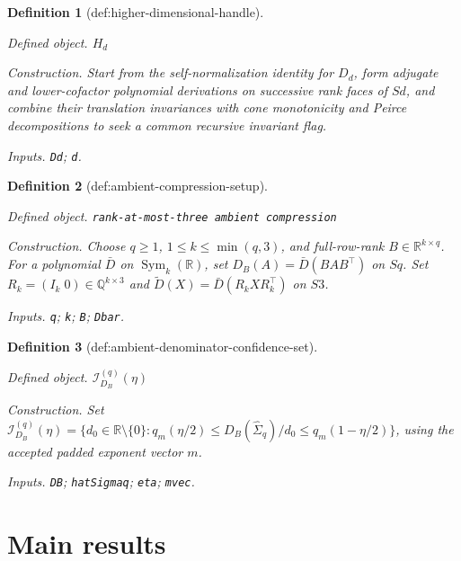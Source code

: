 \documentclass{article}
\newtheorem{definition}{Definition}
\begin{document}
\begin{definition}[def:higher-dimensional-handle]\label{def:higher-dimensional-handle}
\par\smallskip\noindent\emph{Defined object.} \(H_d\)
\par\smallskip\noindent\emph{Construction.} Start from the self-normalization identity for \(D_d\), form adjugate and lower-cofactor polynomial derivations on successive rank faces of \(Sd\), and combine their translation invariances with cone monotonicity and Peirce decompositions to seek a common recursive invariant flag.
\par\smallskip\noindent\emph{Inputs.} \texttt{Dd}; \texttt{d}.
\end{definition}

\begin{definition}[def:ambient-compression-setup]\label{def:ambient-compression-setup}
\par\smallskip\noindent\emph{Defined object.} \texttt{rank-\allowbreak{}at-\allowbreak{}most-\allowbreak{}three ambient compression}
\par\smallskip\noindent\emph{Construction.} Choose \(q\geq1\), \(1\leq k\leq\min(q,3)\), and full-row-rank \(B\in\mathbb R^{k\times q}\). For a polynomial \(\bar D\) on \(\operatorname{Sym}_k(\mathbb R)\), set \(D_B(A)=\bar D(BAB^{\top})\) on \(Sq\). Set \(R_k=(I_k\;0)\in\mathbb Q^{k\times3}\) and \(\widetilde D(X)=\bar D(R_kXR_k^{\top})\) on \(S3\).
\par\smallskip\noindent\emph{Inputs.} \texttt{q}; \texttt{k}; \texttt{B}; \texttt{Dbar}.
\end{definition}

\begin{definition}[def:ambient-denominator-confidence-set]\label{def:ambient-denominator-confidence-set}
\par\smallskip\noindent\emph{Defined object.} \(\mathcal I_{D_B}^{(q)}(\eta)\)
\par\smallskip\noindent\emph{Construction.} Set \(\mathcal I_{D_B}^{(q)}(\eta)=\{d_0\in\mathbb R\setminus\{0\}:q_m(\eta/2)\leq D_B(\widehat\Sigma_q)/d_0\leq q_m(1-\eta/2)\}\), using the accepted padded exponent vector \(m\).
\par\smallskip\noindent\emph{Inputs.} \texttt{DB}; \texttt{hatSigmaq}; \texttt{eta}; \texttt{mvec}.
\end{definition}

\section{Main results}
\end{document}
